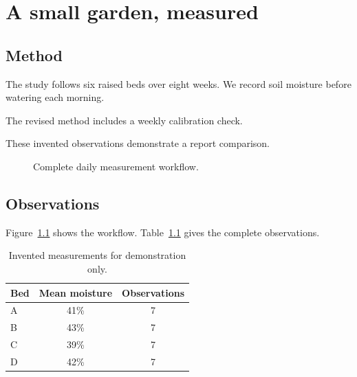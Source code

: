 \documentclass[12pt,a4paper]{report}
\begin{document}
\chapter{A small garden, measured}
\section{Method}
The study follows six raised beds over eight weeks.
We record soil moisture before watering each morning.

The revised method includes a weekly calibration check.

These invented observations demonstrate a report comparison.
\begin{figure}[H]\centering
{}
\caption{Complete daily measurement workflow.}\label{fig:workflow}
\end{figure}
\section{Observations}
Figure~\ref{fig:workflow} shows the workflow. Table~\ref{tab:observations} gives the complete observations.
\begin{table}[H]\centering
\caption{Invented measurements for demonstration only.}\label{tab:observations}
\begin{tabular}{lcc}\toprule
Bed & Mean moisture & Observations\\\midrule
A & 41\% & 7\\
B & 43\% & 7\\
C & 39\% & 7\\
D & 42\% & 7\\
\bottomrule\end{tabular}
\end{table}
\end{document}
